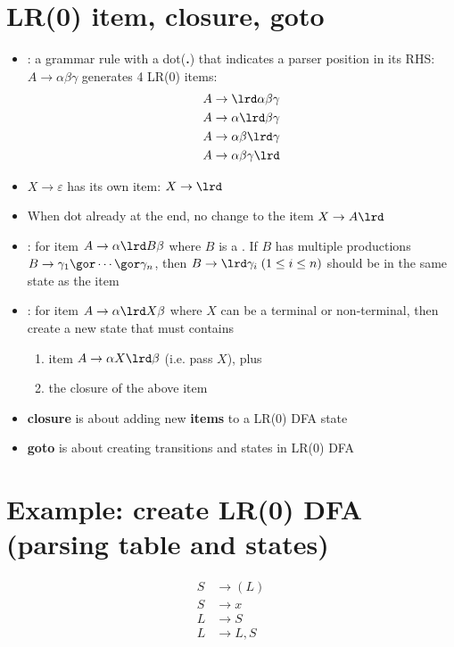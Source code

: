 \section*{LR(0) item, closure, goto}
\begin{itemize}
\item {}: a grammar rule with a dot(\textbf{.}) that indicates a
  parser position in its RHS: $A \to \alpha\beta\gamma$ generates 4 LR(0) items:
  \begin{align*}
    A &\to \lrd\alpha\beta\gamma \\
    A &\to \alpha\lrd\beta\gamma \\
    A &\to \alpha\beta\lrd\gamma \\
    A &\to \alpha\beta\gamma\lrd
  \end{align*}
\item $X \to\varepsilon$ has its own item: $X\to\lrd$
\item When dot already at the end, no change to the item $X\to A\lrd$
\item {}: for item $A\to\alpha\lrd B\beta$ where $B$ is a . If $B$ has multiple productions $B\to \gamma_1 \gor \cdots \gor \gamma_n$, then  $B\to\lrd\gamma_i\;(1 \leq i \leq n)$ should be in the same state as the item
\item {}: for item $A\to\alpha\lrd X\beta$ where $X$ can be a terminal or non-terminal, then create a new state that must contains
  \begin{enumerate}
  \item item $A\to\alpha X\lrd\beta$ (i.e. pass $X$), plus
  \item the closure of the above item
  \end{enumerate}
\item \textbf{closure} is about adding new \textbf{items} to a LR(0) DFA state
\item \textbf{goto} is about creating transitions and states in LR(0) DFA
\end{itemize}
\section*{Example: create LR(0) DFA (parsing table and states)}
\begin{align*}
  S&\to (L)   \tag{1} \\
  S&\to x     \tag{2} \\
  L&\to S     \tag{3} \\
  L&\to L,S   \tag{4}
\end{align*}

